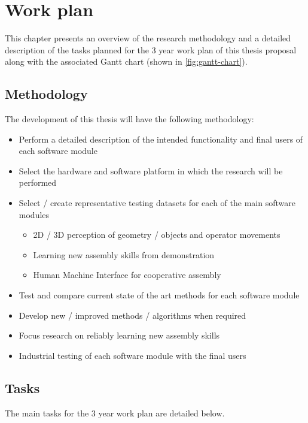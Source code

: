 \chapter{Work plan}\label{chap:work-plan}

This chapter presents an overview of the research methodology and a detailed description of the tasks planned for the 3 year work plan of this thesis proposal along with the associated Gantt chart (shown in \cref{fig:gantt-chart}).


\section{Methodology}

The development of this thesis will have the following methodology:

\begin{itemize}
	\item Perform a detailed description of the intended functionality and final users of each software module
	\item Select the hardware and software platform in which the research will be performed
	\item Select / create representative testing datasets for each of the main software modules
	\begin{itemize}
		\item 2D / 3D perception of geometry / objects and operator movements
		\item Learning new assembly skills from demonstration
		\item Human Machine Interface for cooperative assembly
	\end{itemize}
	\item Test and compare current state of the art methods for each software module
	\item Develop new / improved methods / algorithms when required
	\item Focus research on reliably learning new assembly skills
	\item Industrial testing of each software module with the final users
\end{itemize}



\section{Tasks}

The main tasks for the 3 year work plan are detailed below.


